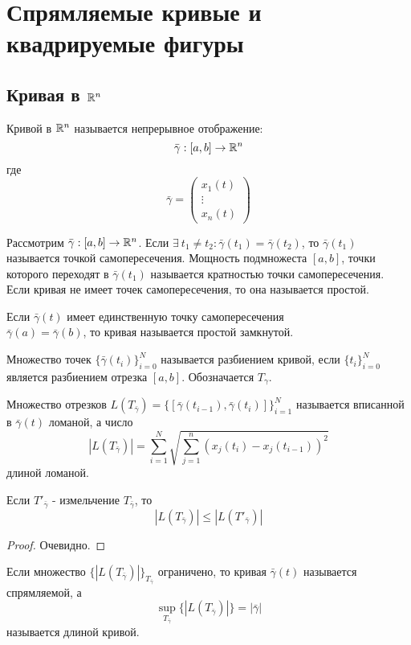 \section{Спрямляемые кривые и квадрируемые фигуры}
\subsection{Кривая в \texorpdfstring{$\mathbb{R}^n$}{Rn}}

\begin{definition}
    Кривой в $\mathbb{R}^n$ называется непрерывное отображение:
    \[\bar{\gamma}: [a,b]\to \mathbb{R}^n\]
    где
    \[\bar{\gamma}=\begin{pmatrix}
       x_1(t)\\
       \vdots\\
       x_n(t) 
    \end{pmatrix}\]
\end{definition} 
\begin{definition}
    Рассмотрим $\bar{\gamma}: [a,b]\to \mathbb{R}^n$. Если $\exists\ t_1\ne t_2: \bar{\gamma}(t_1)=\bar{\gamma}(t_2)$, то $\bar{\gamma}(t_1)$ называется точкой самопересечения. Мощность подмножеста $[a,b]$, точки которого переходят в $\bar{\gamma}(t_1)$ называется кратностью точки самопересечения. Если кривая не имеет точек самопересечения, то она называется простой.
\end{definition} 
\begin{definition}
    Если $\bar{\gamma}(t)$ имеет единственную точку самопересечения\\
    $\bar{\gamma}(a)=\bar{\gamma}(b)$, то кривая называется простой замкнутой.
\end{definition} 
\begin{definition}
    Множество точек $\{\bar{\gamma}(t_i)\}_{i=0}^N$ называется разбиением кривой, если $\{t_i\}_{i=0}^N$ является разбиением отрезка $[a,b]$. Обозначается $T_{\gamma}$.
\end{definition} 
\begin{definition}
    Множество отрезков $L(T_{\bar{\gamma}})=\{[\bar{\gamma}(t_{i-1}),\bar{\gamma}(t_i)]\}_{i=1}^N$ называется вписанной в $\bar{\gamma}(t)$ ломаной, а число
    \[|L(T_{\bar{\gamma}})| = \sum_{i = 1}^{N} \sqrt{ \sum_{j = 1}^{n}(x_j(t_i) - x_j(t_{i - 1}))^2}\]
    длиной ломаной.
\end{definition} 
\begin{statement}
    Если $T'_{\bar{\gamma}}$ - измельчение $T_{\bar{\gamma}}$, то 
    \[|L(T_{\bar{\gamma}})|\leq |L(T'_{\bar{\gamma}})|\]
\end{statement} 
\begin{proof}
    Очевидно.
\end{proof} 
\begin{definition}
    Если множество $\{|L(T_{\bar{\gamma}})|\}_{T_{\bar{\gamma}}}$ ограничено, то кривая $\bar{\gamma}(t)$ называется спрямляемой, а
    \[\sup\limits_{T_{\bar{\gamma}}}\{|L(T_{\bar{\gamma}})|\}=|\bar{\gamma}|\]
    называется длиной кривой.
\end{definition} 